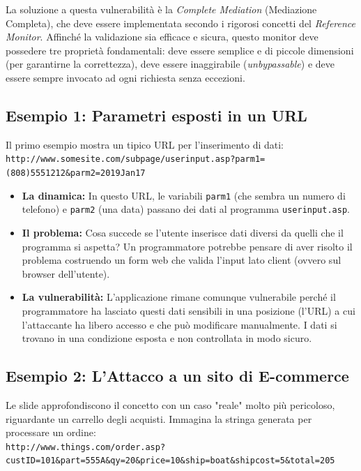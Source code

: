 \documentclass{article}
\begin{document}
\vspace{0.3cm}
\noindent La soluzione a questa vulnerabilità è la \textit{Complete Mediation} (Mediazione Completa), che deve essere implementata secondo i rigorosi concetti del \textit{Reference Monitor}. 
Affinché la validazione sia efficace e sicura, questo monitor deve possedere tre proprietà fondamentali: deve essere semplice e di piccole dimensioni (per garantirne la correttezza), deve essere inaggirabile (\textit{unbypassable}) e deve essere sempre invocato ad ogni richiesta senza eccezioni.

\vspace{0.5cm}

\subsection*{Esempio 1: Parametri esposti in un URL}

Il primo esempio mostra un tipico URL per l'inserimento di dati: \\
\texttt{http://www.somesite.com/subpage/userinput.asp?parm1=(808)5551212\&parm2=2019Jan17}

\begin{itemize}
    \item \textbf{La dinamica:} In questo URL, le variabili \texttt{parm1} (che sembra un numero di telefono) e \texttt{parm2} (una data) passano dei dati al programma \texttt{userinput.asp}.
    \item \textbf{Il problema:} Cosa succede se l'utente inserisce dati diversi da quelli che il programma si aspetta? Un programmatore potrebbe pensare di aver risolto il problema costruendo un form web che valida l'input lato client (ovvero sul browser dell'utente).
    \item \textbf{La vulnerabilità:} L'applicazione rimane comunque vulnerabile perché il programmatore ha lasciato questi dati sensibili in una posizione (l'URL) a cui l'attaccante ha libero accesso e che può modificare manualmente. 
    I dati si trovano in una condizione esposta e non controllata in modo sicuro.
\end{itemize}

\vspace{0.5cm}

\subsection*{Esempio 2: L'Attacco a un sito di E-commerce}

Le slide approfondiscono il concetto con un caso "reale" molto più pericoloso, riguardante un carrello degli acquisti. Immagina la stringa generata per processare un ordine: \\
\texttt{http://www.things.com/order.asp?custID=101\&part=555A\&qy=20\&price=10\&ship=boat\&shipcost=5\&total=205}
\end{document}
